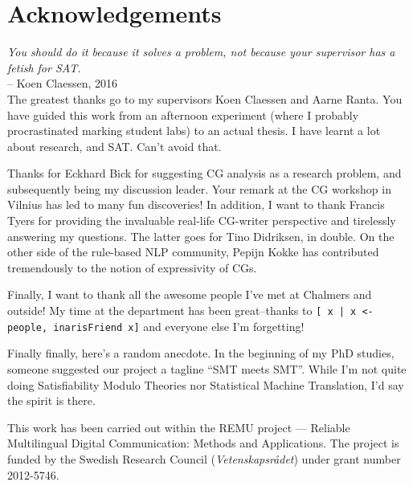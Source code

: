 \chapter*{Acknowledgements}\label{chp:acknowledgements}


\emph{You should do it because it solves a problem, not because your supervisor has a fetish for SAT.} \\
-- Koen Claessen, 2016 \\

The greatest thanks go to my supervisors Koen Claessen and Aarne Ranta. 
You have guided this work from an afternoon experiment (where I probably procrastinated marking student labs) to an actual thesis. I have learnt a lot about research,  and SAT. Can't avoid that.


Thanks for Eckhard Bick for suggesting CG analysis as a research
problem, and subsequently being my discussion leader. 
Your remark at the CG workshop in Vilnius has led to many fun discoveries!
In addition, I want to thank Francis Tyers for providing the invaluable real-life CG-writer perspective and tirelessly answering my questions. The latter goes for Tino Didriksen, in double. On the other side of the rule-based NLP community, Pepijn Kokke 
has contributed tremendously to the notion of expressivity of CGs.

Finally, I want to thank all the awesome people I've met at Chalmers and outside! 
My time at the department has been great--thanks to 
\texttt{[ x | x <- people, inarisFriend x]} and everyone else I'm forgetting! 









Finally finally, here's a random anecdote. 
In the beginning of my PhD studies, someone suggested our project 
a tagline ``SMT meets SMT''. While I'm not quite doing Satisfiability
Modulo Theories nor Statistical Machine Translation, I'd say the spirit is there.






\vfill\noindent
This work has been carried out within the REMU project — Reliable Multilingual Digital Communication: Methods and Applications.
The project is funded by the Swedish Research Council (\emph{Vetenskapsrådet}) under grant number 2012-5746.
